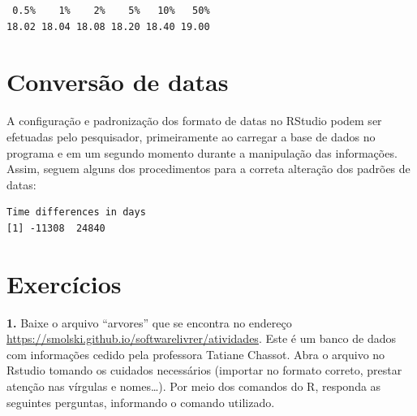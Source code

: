 \documentclass[12pt,brazil,oneside]{book}
\newenvironment{Shaded}{\begin{snugshade}}{\end{snugshade}}
\newcommand{\CommentTok}[1]{\textcolor[rgb]{0.56,0.35,0.01}{\textit{#1}}}
\newcommand{\DataTypeTok}[1]{\textcolor[rgb]{0.13,0.29,0.53}{#1}}
\newcommand{\KeywordTok}[1]{\textcolor[rgb]{0.13,0.29,0.53}{\textbf{#1}}}
\newcommand{\NormalTok}[1]{#1}
\newcommand{\OperatorTok}[1]{\textcolor[rgb]{0.81,0.36,0.00}{\textbf{#1}}}
\newcommand{\StringTok}[1]{\textcolor[rgb]{0.31,0.60,0.02}{#1}}
\begin{document}
\begin{verbatim}
 0.5%    1%    2%    5%   10%   50% 
18.02 18.04 18.08 18.20 18.40 19.00 
\end{verbatim}

\hypertarget{conversao-de-datas}{%
\section{Conversão de datas}\label{conversao-de-datas}}

A configuração e padronização dos formato de datas no RStudio podem ser
efetuadas pelo pesquisador, primeiramente ao carregar a base de dados no
programa e em um segundo momento durante a manipulação das informações.
Assim, seguem alguns dos procedimentos para a correta alteração dos
padrões de datas:

\begin{Shaded}
\end{Shaded}

\begin{verbatim}
Time differences in days
[1] -11308  24840
\end{verbatim}

\hypertarget{exercicios}{%
\section{Exercícios}\label{exercicios}}

\textbf{1.} Baixe o arquivo ``arvores'' que se encontra no endereço
\url{https://smolski.github.io/softwarelivrer/atividades}. Este é um
banco de dados com informações cedido pela professora Tatiane Chassot.
Abra o arquivo no Rstudio tomando os cuidados necessários (importar no
formato correto, prestar atenção nas vírgulas e nomes\ldots{}). Por meio
dos comandos do R, responda as seguintes perguntas, informando o comando
utilizado.
\end{document}

